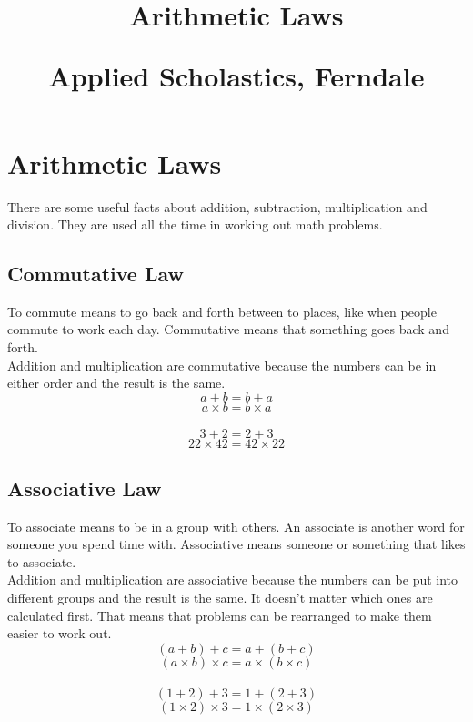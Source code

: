 \documentclass{article}
\author{}
\date{}
\title{Arithmetic Laws\\
\vspace{28pt}
\begin{normalsize}Applied Scholastics, Ferndale \end{normalsize}}
\begin{document}
\maketitle
\pagebreak

\section*{Arithmetic Laws}

There are some useful facts about addition, subtraction, multiplication and division. They are used all the time in working out math problems.\\

\subsection*{Commutative Law}
To commute means to go back and forth between to places, like when people commute to work each day. Commutative means that something goes back and forth.\\

Addition and multiplication are commutative because the numbers can be in either order and the result is the same.\\

$$a + b  =  b + a$$
$$a \times b  =  b \times a$$\\

$$3 + 2 = 2 + 3$$
$$22 \times 42 = 42 \times 22$$

\newpage

\subsection*{Associative Law}

To associate means to be in a group with others. An associate is another word for someone you spend time with. Associative means someone or something that likes to associate.\\

Addition and multiplication are associative because the numbers can be put into different groups and the result is the same. It doesn't matter which ones are calculated first. That means that problems can be rearranged to make them easier to work out.\\

$$(a + b) + c  =  a + (b + c)$$
$$(a \times b) \times c  =  a \times (b \times c)$$\\

$$(1+2)+3=1+(2+3)$$
$$(1\times2)\times3=1\times(2\times3)$$
\end{document}
